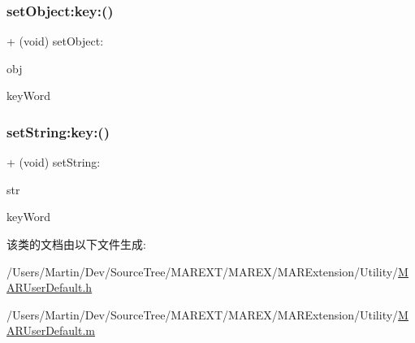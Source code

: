 \subsubsection{\texorpdfstring{set\+Object\+:key\+:()}{setObject:key:()}}
{\footnotesize\ttfamily + (void) set\+Object\+: \begin{DoxyParamCaption}\item[{(id)}]{obj }\item[{key:(N\+S\+String$\ast$)}]{key\+Word }\end{DoxyParamCaption}}

\mbox{\label{interface_m_a_r_user_default_a1ac6ff1218023fa06df4261fefc5d720}} 
\subsubsection{\texorpdfstring{set\+String\+:key\+:()}{setString:key:()}}
{\footnotesize\ttfamily + (void) set\+String\+: \begin{DoxyParamCaption}\item[{(N\+S\+String$\ast$)}]{str }\item[{key:(N\+S\+String$\ast$)}]{key\+Word }\end{DoxyParamCaption}}



该类的文档由以下文件生成\+:\begin{DoxyCompactItemize}
\item 
/\+Users/\+Martin/\+Dev/\+Source\+Tree/\+M\+A\+R\+E\+X\+T/\+M\+A\+R\+E\+X/\+M\+A\+R\+Extension/\+Utility/\hyperlink{_m_a_r_user_default_8h}{M\+A\+R\+User\+Default.\+h}\item 
/\+Users/\+Martin/\+Dev/\+Source\+Tree/\+M\+A\+R\+E\+X\+T/\+M\+A\+R\+E\+X/\+M\+A\+R\+Extension/\+Utility/\hyperlink{_m_a_r_user_default_8m}{M\+A\+R\+User\+Default.\+m}\end{DoxyCompactItemize}
